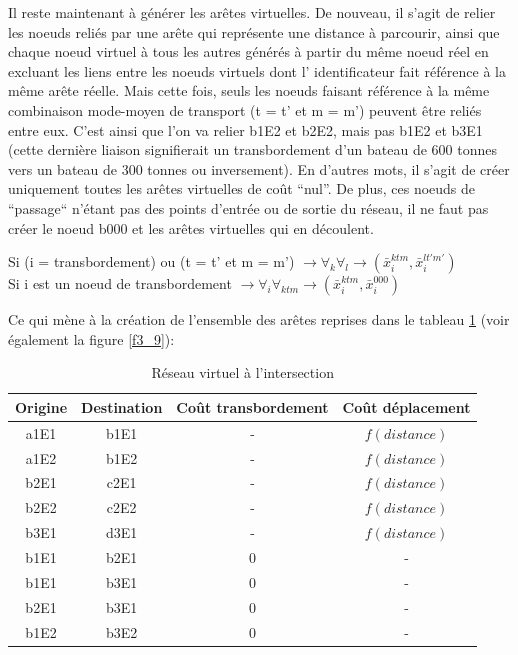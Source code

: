 Il reste maintenant à générer les arêtes virtuelles. De nouveau, il
s'agit de relier les noeuds reliés par une arête qui représente une
distance à parcourir, ainsi que chaque noeud virtuel à tous les
autres générés à partir du même noeud réel en excluant les liens
entre les noeuds virtuels dont l' identificateur fait référence à
la même arête réelle. Mais cette fois, seuls les noeuds faisant
référence à la même combinaison mode-moyen de transport (t = t' et
m = m') peuvent être reliés entre eux. C'est ainsi que l'on va
relier b1E2 et b2E2, mais pas b1E2 et b3E1 (cette dernière liaison
signifierait un transbordement d'un bateau de 600 tonnes vers un
bateau de 300 tonnes ou inversement). En d'autres mots, il s'agit
de créer uniquement toutes les arêtes virtuelles de coût ``nul''.
De plus, ces noeuds de ``passage`` n'étant pas des points d'entrée
ou de sortie du réseau, il ne faut pas créer le noeud b000 et les
arêtes virtuelles qui en découlent.


\begin{center}
Si (i = transbordement) ou (t = t' et m = m') $\rightarrow
\forall_k \forall_{l} \rightarrow(\bar x_i^{ktm},
\bar x_i^{lt'm'})$\\
Si i est un noeud de transbordement $\rightarrow \forall_i
\forall_{ktm}
\rightarrow (\bar x_i^{ktm}, \bar x_i^{000})$
\end{center}

Ce qui mène à la création de l'ensemble des arêtes reprises dans le tableau
\ref{tab3_7} (voir également la figure \ref{f3_9}):

\begin{table}[htbp]
\begin{center}
\begin{tabular}{cccc}
\hline

Origine & Destination & Coût transbordement & Coût déplacement\\
\hline
a1E1 & b1E1 & - & $f(distance)$\\

a1E2 & b1E2 & - & $f(distance)$\\

b2E1 & c2E1 & - & $f(distance)$\\

b2E2 & c2E2 & - & $f(distance)$\\

b3E1 & d3E1 & - & $f(distance)$\\

b1E1 & b2E1 & 0 & -\\

b1E1 & b3E1 & 0 & -\\

b2E1 & b3E1 & 0 & -\\

b1E2 & b3E2 & 0 & -\\
\hline
\end{tabular}
\caption{\label{tab3_7} R\'eseau virtuel \`a l'intersection}
\end{center}
\end{table}

